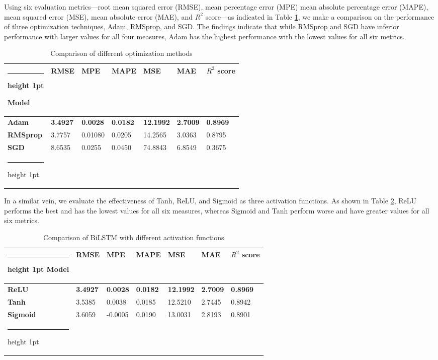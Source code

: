 \documentclass[a4paper]{article}
\makeatletter
\newcommand{\thickhline}{%
    \noalign {\ifnum 0=`}\fi \hrule height 1pt
    \futurelet \reserved@a \@xhline
}
\makeatother
\begin{document}
Using six evaluation metrics—root mean squared error (RMSE), mean percentage error (MPE) mean absolute percentage error (MAPE), mean squared error (MSE),  mean absolute error (MAE), and $R^2$ score—as indicated in Table \ref{table:oa}, we make a comparison on the performance of three optimization techniques, Adam, RMSprop, and SGD. The findings indicate that while RMSprop and SGD have inferior performance with larger values for all four measures, Adam has the highest performance with the lowest values for all six metrics.

\begin{table}[!h]
\centering
\caption{Comparison of different optimization methods}
\label{table:oa}
\vspace{5pt}
\begin{tabular}{lllllll}
\thickhline
\textbf{Model} & \textbf{RMSE} & \textbf{MPE} & \textbf{MAPE} & \textbf{MSE} &\textbf{ MAE} & \textbf{$R^2$ score} \\ 
\hline
\textbf{Adam} & \textbf{3.4927} & \textbf{0.0028} & \textbf{0.0182} & \textbf{12.1992} & \textbf{2.7009} & \textbf{0.8969}\\
\hline
\textbf{RMSprop} & 3.7757 & 0.01080 & 0.0205 & 14.2565 & 3.0363 & 0.8795 \\ 
\hline
\textbf{SGD} & 8.6535 &  0.0255 & 0.0450 & 74.8843 & 6.8549 & 0.3675 \\
\thickhline
\end{tabular}

\end{table}

In a similar vein, we evaluate the effectiveness of Tanh, ReLU, and Sigmoid as three activation functions. As shown in Table \ref{table:af}, ReLU performs the best and has the lowest values for all six measures, whereas Sigmoid and Tanh perform worse and have greater values for all six metrics. 

\begin{table}[!h]
\centering
\caption{Comparison of BiLSTM with different activation functions}
\label{table:af}
\vspace{5pt}
\begin{tabular}{lllllll}
\thickhline\textbf{Model} & \textbf{RMSE} & \textbf{MPE} & \textbf{MAPE} & \textbf{MSE} &\textbf{ MAE} & \textbf{$R^2$ score} \\ 
\hline
\textbf{ReLU} & \textbf{3.4927} & \textbf{0.0028} & \textbf{0.0182} & \textbf{12.1992} & \textbf{2.7009} & \textbf{0.8969} \\
\hline
\textbf{Tanh} & 3.5385 & 0.0038 & 0.0185 & 12.5210 & 2.7445 & 0.8942 \\
\hline
\textbf{Sigmoid} & 3.6059 & -0.0005 & 0.0190 & 13.0031 & 2.8193 & 0.8901 \\
\thickhline
\end{tabular}
\end{table}
\end{document}

